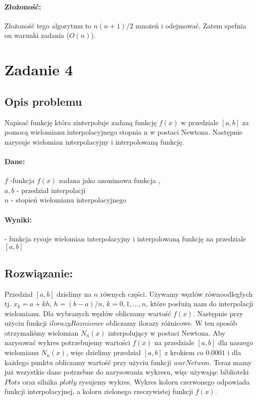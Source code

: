 \documentclass{article}
\begin{document}
\paragraph{Złożoność:}
Złożoność  tego algorytmu to $n(n+1)/2$ mnożeń i odejmować. Zatem spełnia on warunki zadania ($O(n)$).
\newpage
\section{Zadanie 4}
\subsection{Opis problemu}
Napisać funkcję która zinterpoluje zadaną funkcję $f(x)$ w przedziale $[a,b]$ za pomocą  wielomianu interpolacyjnego stopnia n w postaci Newtona. Następnie narysuje wielomian interpolacyjny i interpolowaną funkcję.
\paragraph{Dane:}
\indent $f$ -funkcja $f(x)$ zadana jako anonimowa funkcja ,\\
\indent$a,b$ - przedział interpolacji\\
\indent$n$ - stopień wielomianu interpolacyjnego 
\paragraph{Wyniki:}
\indent - funkcja rysuje wielomian interpolacyjny i interpolowaną funkcję na przedziale $[a,b]$
\subsection{Rozwiązanie:}
Przedział $[a,b]$ dzielimy na $n$ równych części. Używamy węzłów równoodległych tj. $x_k = a + kh$, $h= (b-a)/n$, $k = 0,1,\ldots,n$, które posłużą nam do interpolacji wielomianu. Dla wybranych węzłów obliczamy wartość $f(x)$. Następnie przy użyciu funkcji $ilorazyRoznicowe$ obliczamy ilorazy różnicowe.  W ten sposób otrzymaliśmy wielomian $N_n(x)$ interpolujący w postaci Newtona. Aby narysować wykres potrzebujemy wartości $f(x)$ na przedziale $[a,b]$ dla naszego wielomianu $N_n(x)$, więc dzielimy przedział $[a,b]$ z krokiem co $0.0001$ i dla każdego punktu obliczamy wartość przy użyciu funkcji $warNetwon$. Teraz mamy już wszystkie dane potrzebne do narysowania wykresu, więc używając biblioteki $Plots$ oraz silnika $plotly$ rysujemy wykres. Wykres koloru czerwonego odpowiada funkcji interpolacyjnej, a koloru zielonego rzeczywistej funkcji $f(x)$.
\newpage
\end{document}
